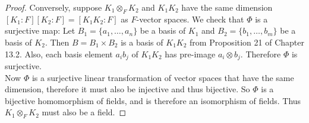 \documentclass{article}
\begin{document}
\begin{proof}
    Conversely, suppose $K_1\otimes_F K_2$ and $K_1K_2$ have the same
    dimension $[K_1:F][K_2:F]=[K_1K_2:F]$ as $F$-vector spaces. We check
    that $\Phi$ is a surjective map: Let $B_1=\{a_1,\ldots,a_n\}$ be a
    basis of $K_1$ and $B_2=\{b_1,\ldots,b_m\}$ be a
    basis of $K_2$. Then $B=B_1\times B_2$ is a basis of $K_1K_2$ from
    Proposition 21 of Chapter 13.2. Also, each basis element $a_ib_j$ of
    $K_1K_2$ has pre-image $a_i\otimes b_j$. Therefore $\Phi$ is
    surjective. \\

    Now $\Phi$ is a surjective linear transformation of vector spaces that
    have the same dimension, therefore it must also be injective and thus
    bijective. So $\Phi$ is a bijective homomorphism of fields, and is
    therefore an isomorphism of fields. Thus $K_1\otimes_F K_2$ must also
    be a field.
  \end{proof}
\end{document}
